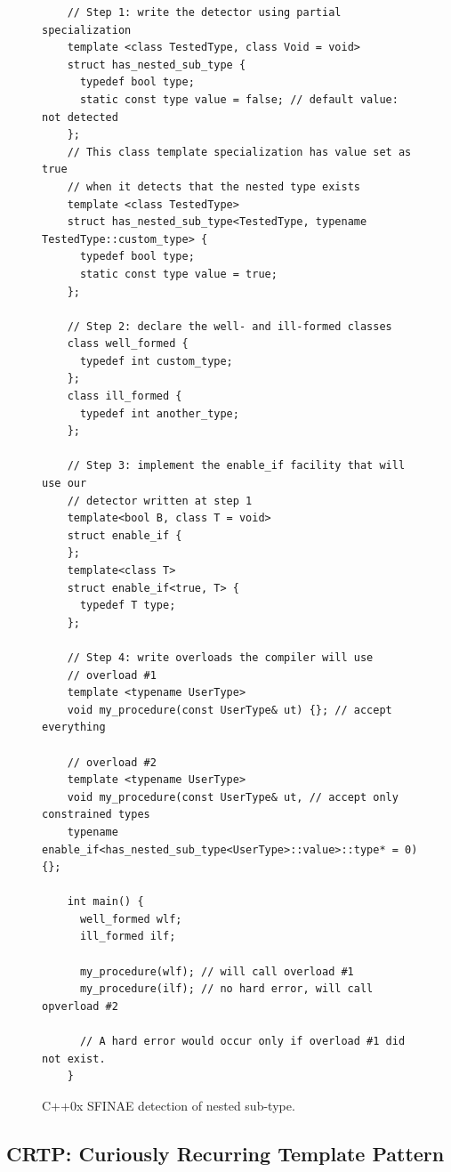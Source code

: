\begin{figure}[tbh]
  \centering
  \begin{verbatim}
    // Step 1: write the detector using partial specialization
    template <class TestedType, class Void = void>
    struct has_nested_sub_type {
      typedef bool type;
      static const type value = false; // default value: not detected
    };
    // This class template specialization has value set as true
    // when it detects that the nested type exists
    template <class TestedType>
    struct has_nested_sub_type<TestedType, typename TestedType::custom_type> {
      typedef bool type;
      static const type value = true;
    };

    // Step 2: declare the well- and ill-formed classes
    class well_formed {
      typedef int custom_type;
    };
    class ill_formed {
      typedef int another_type;
    };

    // Step 3: implement the enable_if facility that will use our
    // detector written at step 1
    template<bool B, class T = void>
    struct enable_if {
    };
    template<class T>
    struct enable_if<true, T> {
      typedef T type;
    };

    // Step 4: write overloads the compiler will use
    // overload #1
    template <typename UserType>
    void my_procedure(const UserType& ut) {}; // accept everything

    // overload #2
    template <typename UserType>
    void my_procedure(const UserType& ut, // accept only constrained types
    typename enable_if<has_nested_sub_type<UserType>::value>::type* = 0) {};

    int main() {
      well_formed wlf;
      ill_formed ilf;

      my_procedure(wlf); // will call overload #1
      my_procedure(ilf); // no hard error, will call opverload #2

      // A hard error would occur only if overload #1 did not exist.
    }
  \end{verbatim}
  \caption{C++0x SFINAE detection of nested sub-type.}
  \label{code:gen.sfinae.nested}
\end{figure}

\subsection{CRTP: Curiously Recurring Template Pattern}
\label{subsec:crtp}

